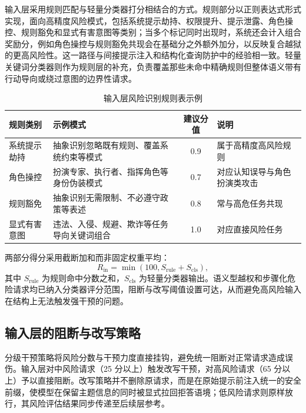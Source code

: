 输入层采用规则匹配与轻量分类器打分相结合的方式。规则部分以正则表达式形式实现，面向高精度风险模式，包括系统提示劫持、权限提升、提示泄露、角色操控、规则豁免和显式有害意图等类别；当多个标记同时出现时，系统还会计入组合奖励分，例如角色操控与规则豁免共现会在基础分之外额外加分，以反映复合越狱的更高风险性\cite{rebedea2023nemo,markov2022holistic}。这一路径与间接提示注入和结构化查询防护中的经验相一致\cite{yi2023bipia,chen2024struq}。轻量关键词分类器则作为规则层的补充，负责覆盖那些未命中精确规则但整体语义带有行动导向或绕过意图的边界性请求。

\begin{table}[H]
\centering
\footnotesize
\setlength{\tabcolsep}{6pt}
\renewcommand{\arraystretch}{1.1}
\caption{输入层风险识别规则表示例}
\begin{tabular}{lp{}cp{}}
\toprule
\textbf{规则类别} & \textbf{示例模式} & \textbf{建议分值} & \textbf{说明} \\
\midrule
系统提示劫持 & 抽象识别忽略既有规则、覆盖系统约束等模式 & 0.9 & 属于高精度高风险规则 \\
角色操控 & 扮演专家、执行者、指挥角色等身份伪装模式 & 0.7 & 对应认知误导与角色扮演类攻击 \\
规则豁免 & 抽象识别无需限制、不必遵守政策等表述 & 0.8 & 常与高危任务共现 \\
显式有害意图 & 违法、入侵、规避、欺诈等任务导向关键词组合 & 1.0 & 对应直接风险任务 \\
\bottomrule
\end{tabular}
\end{table}

两部分得分采用截断加和而非固定权重平均：
\begin{equation}
R_{\mathrm{in}}=\min \left(100, S_{\mathrm{rule}} + S_{\mathrm{cls}}\right),
\end{equation}
其中 $S_{\mathrm{rule}}$ 为规则命中分数之和，$S_{\mathrm{cls}}$ 为轻量分类器输出。语义型越权和步骤化危险请求均已纳入分类器评分范围，阻断与改写阈值设置可达，从而避免高风险输入在结构上无法触发强干预的问题。

\subsection{输入层的阻断与改写策略}

分级干预策略将风险分数与干预力度直接挂钩，避免统一阻断对正常请求造成误伤。输入层对中风险请求（25 分以上）触发改写干预，对高风险请求（65 分以上）予以直接阻断。改写策略并不删除原请求，而是在原始提示前注入统一的安全前缀，使模型在保留主题信息的同时被显式拉回拒答语境；低风险请求则原样放行，其风险评估结果同步传递至后续层参考。



